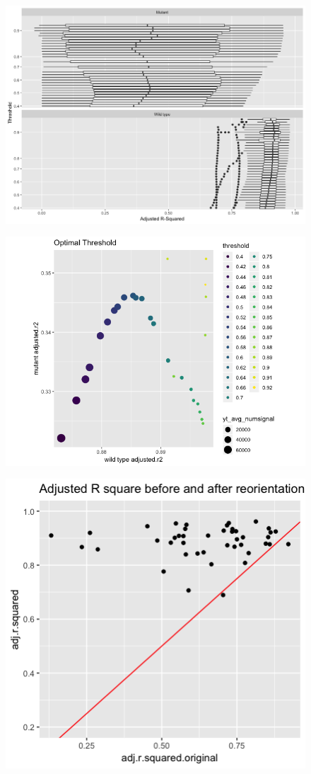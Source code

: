 \documentclass[10pt,letterpaper]{article}
\begin{document}
\begin{figure}[H]
\includegraphics[width=0.9\linewidth]{visualization_paper/threshold_boxplot} \end{figure}

\begin{figure}[H]
\includegraphics[width=0.9\linewidth]{visualization_paper/optimal_threshold2} \end{figure}

\begin{figure}[H]
\includegraphics[width=0.8\linewidth]{visualization_paper/adj_r2_before_after_wt} \end{figure}
\end{document}
